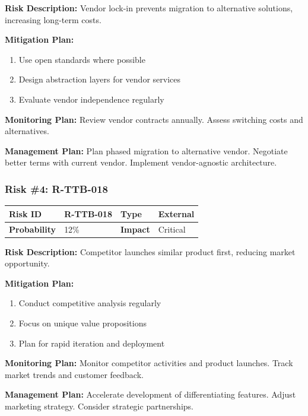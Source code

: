 \textbf{Risk Description:} Vendor lock-in prevents migration to alternative solutions, increasing long-term costs.

\textbf{Mitigation Plan:}
\begin{enumerate}[leftmargin=*]
    \item Use open standards where possible
    \item Design abstraction layers for vendor services
    \item Evaluate vendor independence regularly
\end{enumerate}

\textbf{Monitoring Plan:} Review vendor contracts annually. Assess switching costs and alternatives.

\textbf{Management Plan:} Plan phased migration to alternative vendor. Negotiate better terms with current vendor. Implement vendor-agnostic architecture.

\subsubsection{Risk \#4: R-TTB-018}

\begin{table}[h]
\small
\begin{tabular}{|p{3cm}|p{3cm}|p{3cm}|p{3cm}|}
\hline
\textbf{Risk ID} & R-TTB-018 & \textbf{Type} & External \\
\hline
\textbf{Probability} & 12\% & \textbf{Impact} & Critical \\
\hline
\end{tabular}
\end{table}

\textbf{Risk Description:} Competitor launches similar product first, reducing market opportunity.

\textbf{Mitigation Plan:}
\begin{enumerate}[leftmargin=*]
    \item Conduct competitive analysis regularly
    \item Focus on unique value propositions
    \item Plan for rapid iteration and deployment
\end{enumerate}

\textbf{Monitoring Plan:} Monitor competitor activities and product launches. Track market trends and customer feedback.

\textbf{Management Plan:} Accelerate development of differentiating features. Adjust marketing strategy. Consider strategic partnerships.

